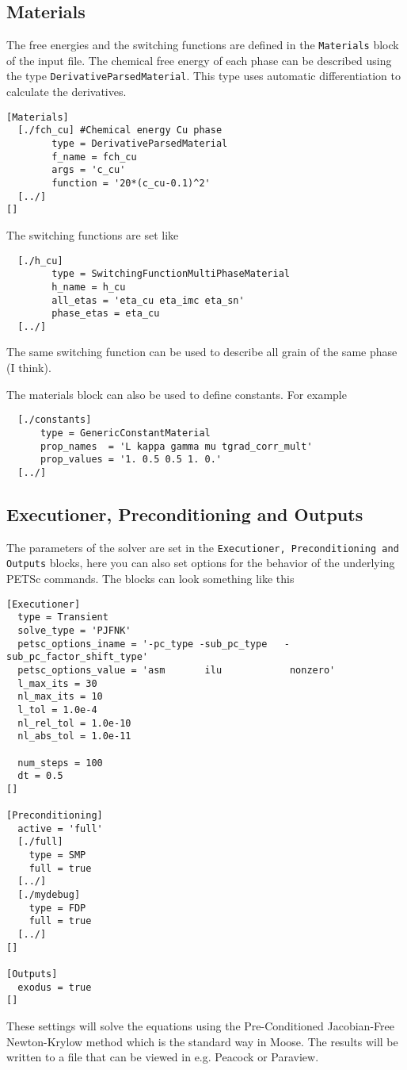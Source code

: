 \documentclass[12pt,a4paper]{article}
\begin{document}
\subsection{Materials}
The free energies and the switching functions are defined in the \texttt{Materials} block of the input file.
The chemical free energy of each phase can be described using the type \texttt{DerivativeParsedMaterial}.
This type uses automatic differentiation to calculate the derivatives.
\begin{verbatim}
[Materials]
  [./fch_cu] #Chemical energy Cu phase
        type = DerivativeParsedMaterial
        f_name = fch_cu
        args = 'c_cu'
        function = '20*(c_cu-0.1)^2'
  [../]
[]
\end{verbatim}

The switching functions are set like
\begin{verbatim}
  [./h_cu]
        type = SwitchingFunctionMultiPhaseMaterial
        h_name = h_cu
        all_etas = 'eta_cu eta_imc eta_sn'
        phase_etas = eta_cu
  [../]
\end{verbatim}
The same switching function can be used to describe all grain of the same phase (I think).

The materials block can also be used to define constants. For example
\begin{verbatim}
  [./constants]
      type = GenericConstantMaterial
      prop_names  = 'L kappa gamma mu tgrad_corr_mult'
      prop_values = '1. 0.5 0.5 1. 0.'
  [../]
\end{verbatim}
\subsection{Executioner, Preconditioning and Outputs}
The parameters of the solver are set in the \texttt{Executioner, Preconditioning and Outputs} blocks, here you can also set options for the behavior of the underlying PETSc commands.
The blocks can look something like this
\begin{verbatim}
[Executioner]
  type = Transient
  solve_type = 'PJFNK'
  petsc_options_iname = '-pc_type -sub_pc_type   -sub_pc_factor_shift_type'
  petsc_options_value = 'asm       ilu            nonzero'
  l_max_its = 30
  nl_max_its = 10
  l_tol = 1.0e-4
  nl_rel_tol = 1.0e-10
  nl_abs_tol = 1.0e-11

  num_steps = 100
  dt = 0.5
[]

[Preconditioning]
  active = 'full'
  [./full]
    type = SMP
    full = true
  [../]
  [./mydebug]
    type = FDP
    full = true
  [../]
[]

[Outputs]
  exodus = true
[]
\end{verbatim}
These settings will solve the equations using the Pre-Conditioned Jacobian-Free Newton-Krylow method which is the standard way in Moose.
The results will be written to a file that can be viewed in e.g. Peacock or Paraview.



\end{document}
